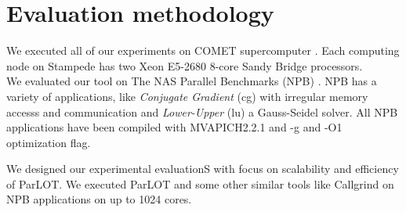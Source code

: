 \section{Evaluation methodology}
We executed all of our experiments on COMET supercomputer . Each computing node on Stampede has two Xeon E5-2680 8-core Sandy Bridge processors.\\

We evaluated our tool on The NAS Parallel Benchmarks (NPB) \cite{nas}. NPB has a variety of applications, like \textit{Conjugate Gradient} (cg) with irregular memory accesss and communication and \textit{Lower-Upper} (lu) a Gauss-Seidel solver.
All NPB applications have been compiled with MVAPICH2.2.1 and -g and -O1 optimization flag.

We designed our experimental evaluationS with focus on scalability and efficiency of ParLOT. We executed ParLOT and some other similar tools like Callgrind on NPB applications on up to 1024 cores.
